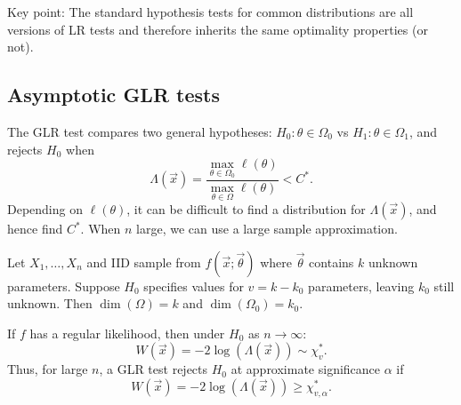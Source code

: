 \documentclass[10pt, a4paper]{article}
\begin{document}
Key point:
The standard hypothesis tests for common distributions are all versions of LR tests and therefore inherits the same optimality properties
(or not).

\subsection{Asymptotic GLR tests}
The GLR test compares two general hypotheses:
$H_0 : \theta \in \Omega_0$ vs $H_1 : \theta \in \Omega_1$,
and rejects $H_0$ when
\[
\Lambda(\vec{x}) = \frac{\max_{\theta \in \Omega_0}\ell(\theta)}{\max_{\theta \in \Omega}\ell(\theta)} < C ^ {*}.
\]
Depending on $\ell(\theta)$,
it can be difficult to find a distribution for $\Lambda(\vec{x})$,
and hence find $C ^ {*}$.
When $n$ large,
we can use a large sample approximation.

\begin{theorem}
    Let $X_1, \dotsc, X_n$ and IID sample from $f(\vec{x}; \vec{\theta})$ where $\vec{\theta}$ contains $k$ unknown parameters.
    Suppose $H_0$ specifies values for $v = k - k_0$ parameters,
    leaving $k_0$ still unknown.
    Then $\dim(\Omega) = k$ and $\dim(\Omega_0) = k_0$.

    If $f$ has a regular likelihood,
    then under $H_0$ as $n \to \infty$:
    \[
    W(\vec{x}) = -2\log(\Lambda(\vec{x})) \sim \chi_{v}^{*}.
    \]
    Thus,
    for large $n$,
    a GLR test rejects $H_0$ at approximate significance $\alpha$ if
    \[
    W(\vec{x}) = -2\log(\Lambda(\vec{x})) \geq \chi_{v, \alpha}^{*}.
    \]


\end{theorem}
\end{document}
